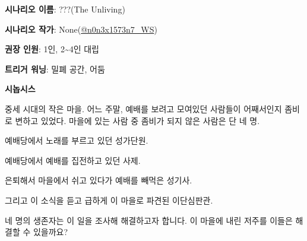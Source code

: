 \documentclass{report}
\begin{document}
	\textbf{시나리오 이름}: ???(The Unliving)
	
	\textbf{시나리오 작가}: None(\href{https://www.twitter.com/n0n3x1573n7_WS}{@n0n3x1573n7\_WS})
	
	\textbf{권장 인원}: 1인, 2\textasciitilde4인 대립
	
	\textbf{트리거 워닝}: 밀폐 공간, 어둠
	
	\textbf{시놉시스}
	
	중세 시대의 작은 마을. 어느 주말, 예배를 보려고 모여있던 사람들이 어째서인지 좀비로 변하고 있었다. 마을에 있는 사람 중 좀비가 되지 않은 사람은 단 네 명.
	
	예배당에서 노래를 부르고 있던 성가단원.
	
	예배당에서 예배를 집전하고 있던 사제.
	
	은퇴해서 마을에서 쉬고 있다가 예배를 빼먹은 성기사.
	
	그리고 이 소식을 듣고 급하게 이 마을로 파견된 이단심판관.
	
	네 명의 생존자는 이 일을 조사해 해결하고자 합니다. 이 마을에 내린 저주를 이들은 해결할 수 있을까요?
\end{document}
